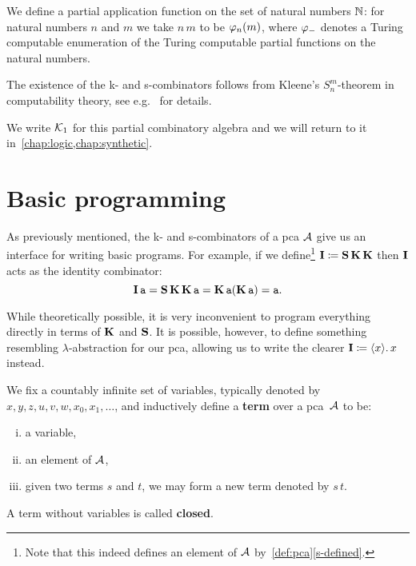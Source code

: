 \begin{example}
  We define a partial application function on the set of natural numbers
  \(\Nat\): for natural numbers \(n\) and \(m\) we take \(n\,m\) to be
  \(\prenum{n}(m)\), where \(\prenum{-}\) denotes a Turing computable
  enumeration of the Turing computable partial functions on the natural numbers.

  The existence of the k- and s-combinators follows from Kleene's
  \(S^m_n\)-theorem in computability theory, see e.g.~\cite[Section~2.5.1 and
  Theorem~2.1.5]{Bauer2023} for details.

  We write \(\Kone\) for this partial combinatory algebra and we will return to
  it in~\cref{chap:logic,chap:synthetic}.
\end{example}

\section{Basic programming}

As previously mentioned, the k- and s-combinators of a pca \(\AA\) give us an
interface for writing basic programs. For example, if we define\footnote{Note
  that this indeed defines an element of \(\AA\)
  by~\cref{def:pca}\ref{s-defined}.}
\(\icomb \coloneq \scomb\kcomb\kcomb\) then \(\icomb\) acts as the
identity combinator:
\[
  \icomb\pca{a} = \scomb\kcomb\kcomb\pca{a} = \kcomb\pca{a}(\kcomb\pca{a}) =
  {\pca{a}}.
\]

While theoretically possible, it is very inconvenient to program everything
directly in terms of \(\kcomb\) and \(\scomb\). It is possible, however, to
define something resembling \(\lambda\)-abstraction for our pca, allowing us to
write the clearer \(\icomb \coloneq \lambdapca{x}{\var{x}}\) instead.

\begin{definition}
  We fix a countably infinite set of variables, typically denoted by
  \(x,y,z,u,v,w,x_0,x_1,\dots\), and inductively define a \textbf{term} over a
  pca~\(\AA\) to be:
  \begin{enumerate}[(i)]
  \item a variable,
  \item an element of \(\AA\),
  \item given two terms \(s\) and \(t\), we may form a new term denoted by \(s\,t\).
  \end{enumerate}
  A term without variables is called \textbf{closed}.
\end{definition}


